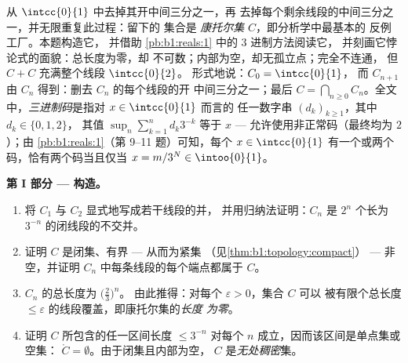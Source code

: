 \begin{problem}[{周末问题 --- 康托尔三分集：
长度为零、不可数、完备，且 $C + C =
\intcc{0}{2}$}]
\label{pb:b1:topology:1}
从 $\intcc{0}{1}$ 中去掉其开中间三分之一，再
去掉每个剩余线段的中间三分之一，并无限重复此过程：留下的
集合是 \emph{康托尔集} $C$，即分析学中最基本的
反例工厂。本题构造它，
并借助 \cref{pb:b1:reals:1} 中的 $3$ 进制方法阅读它，
并刻画它悖论式的面貌：总长度为零，却
不可数；内部为空，却无孤立点；完全不连通，
但 $C + C$ 充满整个线段
$\intcc{0}{2}$。 形式地说：$C_0 = \intcc{0}{1}$，
        而 $C_{n+1}$ 由 $C_n$ 得到：删去 $C_n$ 的每个线段的开
        中间三分之一；最后 $C = \bigcap_{n \geq 0}
C_n$。全文中，\emph{三进制码}是指对 $x \in \intcc{0}{1}$ 而言的
        任一数字串 $(d_k)_{k\geq1}$，其中 $d_k \in \{0, 1, 2\}$，
        其值 $\sup_n \sum_{k=1}^n d_k 3^{-k}$ 等于 $x$ ---
        允许使用非正常码（最终均为 $2$）；由
        \cref{pb:b1:reals:1}（第 9--11 题）可知，每个 $x \in
\intcc{0}{1}$ 有一个或两个码，恰有两个码当且仅当 $x = m/3^N
\in \intoo{0}{1}$。

\medskip
\noindent\textbf{第 I 部分 --- 构造。}
\begin{enumerate}
  \item 将 $C_1$ 与 $C_2$ 显式地写成若干线段的并，
        并用归纳法证明：$C_n$ 是
        $2^n$ 个长为 $3^{-n}$ 的闭线段的不交并。
  \item 证明 $C$ 是闭集、有界 --- 从而为紧集
        （见\cref{thm:b1:topology:compact}） --- 非空，并证明
        $C_n$ 中每条线段的每个端点都属于
        $C$。
  \item $C_n$ 的总长度为 $\bigl(\frac23\bigr)^n$。
        由此推得：对每个 $\varepsilon > 0$，集合 $C$ 可以
        被有限个总长度
        $\leq \varepsilon$ 的线段覆盖，即康托尔集的\emph{长度
        为零}。
  \item 证明 $C$ 所包含的任一区间长度 $\leq
        3^{-n}$ 对每个 $n$ 成立，因而该区间是单点集或空集：
        $\mathring C = \emptyset$。由于闭集且内部为空，
        $C$ 是\emph{无处稠密}集。
\end{enumerate}


\end{problem}
